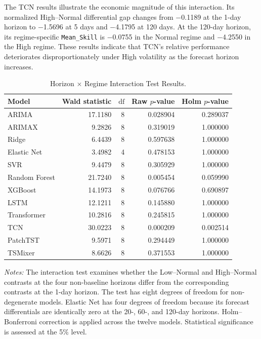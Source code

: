 \documentclass[runningheads,orivec]{llncs}
\begin{document}
The TCN results illustrate the economic magnitude of this interaction. Its normalized High--Normal differential gap changes from $-$0.1189 at the 1-day horizon to $-$1.5696 at 5 days and $-$4.1795 at 120 days. At the 120-day horizon, its regime-specific \texttt{Mean\_Skill} is $-$0.0755 in the Normal regime and $-$4.2550 in the High regime. These results indicate that TCN's relative performance deteriorates disproportionately under High volatility as the forecast horizon increases.

\begin{table}[htbp]
\centering
\caption{Horizon $\times$ Regime Interaction Test Results.}\label{tab:h2_interaction}
\setlength{\tabcolsep}{6pt}
\begin{tabular}{lrrrr}
\hline
Model & Wald statistic & $\mathrm{df}$ & Raw $p$-value & Holm $p$-value \\
\hline
ARIMA         & 17.1180 & 8 & 0.028904 & 0.289037 \\
ARIMAX        &  9.2826 & 8 & 0.319019 & 1.000000 \\
Ridge         &  6.4439 & 8 & 0.597638 & 1.000000 \\
Elastic Net   &  3.4982 & 4 & 0.478153 & 1.000000 \\
SVR           &  9.4479 & 8 & 0.305929 & 1.000000 \\
Random Forest & 21.7240 & 8 & 0.005454 & 0.059990 \\
XGBoost       & 14.1973 & 8 & 0.076766 & 0.690897 \\
LSTM          & 12.1211 & 8 & 0.145880 & 1.000000 \\
Transformer   & 10.2816 & 8 & 0.245815 & 1.000000 \\
TCN           & 30.0223 & 8 & 0.000209 & 0.002514 \\
PatchTST      &  9.5971 & 8 & 0.294449 & 1.000000 \\
TSMixer       &  8.6626 & 8 & 0.371553 & 1.000000 \\
\hline
\end{tabular}
\par\vspace{4pt}\parbox{\linewidth}{\scriptsize\textit{Notes:} The interaction test examines whether the Low--Normal and High--Normal contrasts at the four non-baseline horizons differ from the corresponding contrasts at the 1-day horizon. The test has eight degrees of freedom for non-degenerate models. Elastic Net has four degrees of freedom because its forecast differentials are identically zero at the 20-, 60-, and 120-day horizons. Holm--Bonferroni correction is applied across the twelve models. Statistical significance is assessed at the 5\% level.}
\end{table}
\end{document}
